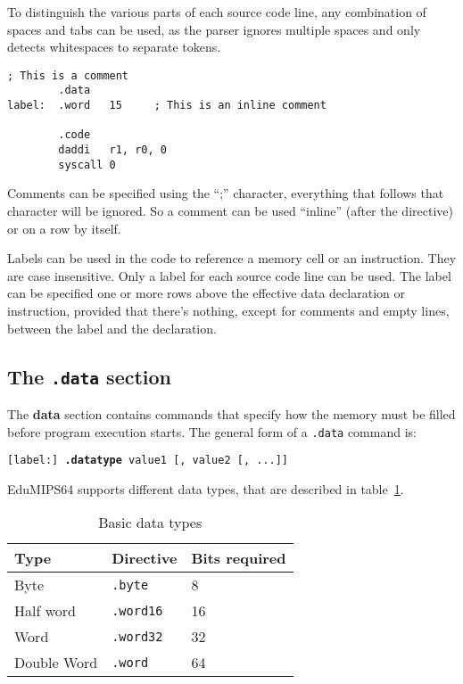 \documentclass[12pt]{report}
\newcommand{\EM}{EduMIPS64}
\begin{document}
To distinguish the various parts of each source code line, any combination of
spaces and tabs can be used, as the parser ignores multiple spaces and only
detects whitespaces to separate tokens.

\begin{lstlisting}[caption={Sample \EM{} code}, label={code:sample}, style={mips}]
; This is a comment
        .data
label:  .word   15     ; This is an inline comment

        .code
        daddi   r1, r0, 0
        syscall 0
\end{lstlisting}

\index{;}
Comments can be specified using the ``;'' character, everything that follows
that character will be ignored. So a comment can be used ``inline'' (after the
directive) or on a row by itself.

 Labels can be used in the code to reference a memory cell or an
instruction.  They are case insensitive. Only a label for each source code line
can be used.  The label can be specified one or more rows above the effective
data declaration or instruction, provided that there's nothing, except for
comments and empty lines, between the label and the declaration. 

\subsection{The \texttt{.data} section}
The \textbf{data} section contains commands that specify how the memory must be
filled before program execution starts. The general form of a \texttt{.data} command
is:

\begin{center}
	\texttt{[label:] \textbf{.datatype} value1 [, value2 [, ...]]}
\end{center}

\EM{} supports different data types, that are described in
table~\ref{table:datatypes}.

\begin{table}[!htb]
	\begin{centering}
		\begin{tabular}{lll}
			\hline
			\hline
			Type & Directive & Bits required\\
			\hline
			Byte & \texttt{.byte} & 8\\
			Half word & \texttt{.word16} & 16\\
			Word & \texttt{.word32} & 32\\
			Double Word & \texttt{.word} & 64
		\end{tabular}
		\caption{Basic data types}
		\label{table:datatypes}
	\end{centering}
\end{table}
\end{document}
